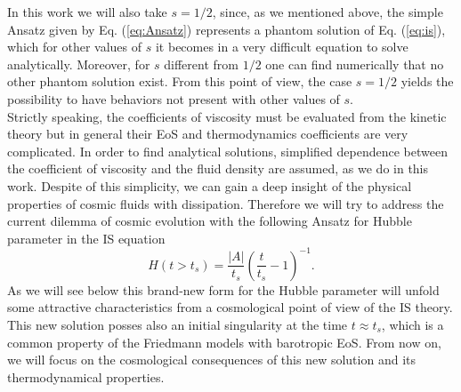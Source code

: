 \documentclass[twocolumn,showpacs,nofootinbib,floats,amsmath,amssymb]{revtex4}
\begin{document}
In this work we will also take $s=1/2$, since, as we mentioned above, the simple Ansatz given by Eq. (\ref{eq:Ansatz}) represents a phantom solution of Eq. (\ref{eq:is}), which for other values of $s$ it becomes in a very difficult equation to solve analytically. Moreover, for $s$ different from $1/2$ one can find numerically that no other phantom solution exist. From this point of view, the case $s=1/2$ yields the possibility to have behaviors not present with other values of $s$.\\   
Strictly speaking, the coefficients of viscosity must be evaluated from the kinetic theory but in general their EoS and thermodynamics coefficients are very complicated. In order to find analytical solutions, simplified dependence between the coefficient of viscosity and the fluid density are assumed, as we do in this work. Despite of this simplicity, we can gain a deep insight of the physical properties of cosmic fluids with dissipation. Therefore we will try to address the current dilemma of cosmic evolution with the following Ansatz for Hubble parameter in the IS equation
\begin{equation}
H(t>t_{s}) = \frac{\left| A\right|}{t_{s}}\left(\frac{t}{t_{s}}-1 \right)^{-1}.
\label{eq:quinte}
\end{equation}
As we will see below this brand-new form for the Hubble parameter will unfold some attractive characteristics from a cosmological point of view of the IS theory. This new solution posses also an initial singularity at the time $t \approx t_{s}$, which is a common property of the Friedmann models with barotropic EoS. From now on, we will focus on the cosmological consequences of this new solution and its thermodynamical properties.\\
\end{document}
